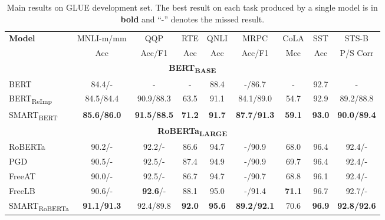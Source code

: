\documentclass[11pt]{article} \usepackage{url}
\newcommand\model{SMART}
\begin{document}
\begin{table*}[!htb]
\begin{center}
		\begin{tabular}{@{\hskip1pt}l@{\hskip1pt}|@{\hskip1pt}c@{\hskip1pt}|c@{\hskip1pt}|c@{\hskip1pt}|c@{\hskip1pt}|c@{\hskip1pt}|@{\hskip1pt}c @{\hskip1pt}|@{\hskip1pt} c @{\hskip1pt}|@{\hskip1pt}c@{\hskip1pt}}
			\hline \bf Model            &MNLI-{m/mm}        &QQP                &RTE            &QNLI           &MRPC               &CoLA           &SST          &STS-B\\ 
			                            &Acc                &Acc/F1             &Acc            &Acc            &Acc/F1             &Mcc            &Acc            &P/S Corr       \\ \hline
			\hline
            \multicolumn{9}{c}{\textbf{BERT\textsubscript{BASE}}}\\ \hline	
			BERT \cite{devlin2018bert}   &84.4/-             &-                  &-              &88.4           &-/86.7             &-              &92.7           &-\\ \hline
			BERT\textsubscript{ReImp}               &84.5/84.4          &90.9/88.3          &63.5           &91.1           &84.1/89.0          &54.7           &92.9           &89.2/88.8\\  \hline
{\model}\textsubscript{BERT}                     &\textbf{85.6/86.0} &\textbf{91.5/88.5} & \textbf{71.2} & \textbf{91.7} &\textbf{87.7/91.3} & \textbf{59.1} &\textbf{93.0}  &\textbf{90.0/89.4} \\ \hline \hline
\multicolumn{9}{c}{\textbf{RoBERTa\textsubscript{LARGE}}}\\	 \hline		
        RoBERTa \cite{liu2019roberta}    &90.2/-         &92.2/-                 &86.6           &94.7           &-/90.9             &68.0           &96.4           &92.4/-\\ \hline 
        PGD \cite{zhu2019freelb}         &90.5/-         &92.5/-                 &87.4           &94.9           &-/90.9             &69.7           &96.4           &92.4/- \\ \hline
        FreeAT \cite{zhu2019freelb}      &90.0/-         &92.5/-                 &86.7           &94.7           &-/90.7             &68.8           &96.1           &92.4/- \\ \hline
        FreeLB \cite{zhu2019freelb}      &90.6/-         &\textbf{92.6}/-        &88.1           &95.0           &-/91.4             &\textbf{71.1}  &96.7           &92.7/- \\ \hline \hline
        {\model}\textsubscript{RoBERTa} &\textbf{91.1/91.3}  &92.4/89.8         &\textbf{92.0}  &\textbf{95.6}  &\textbf{89.2/92.1} &70.6           &\textbf{96.9}  &\textbf{92.8/92.6} \\ \hline
		\end{tabular}
	\end{center}
\caption{Main results on GLUE development set. The best result on each task produced by a single model is in \textbf{bold} and ``-'' denotes the missed result.
	}
	\label{tab:glue_dev}
\end{table*}
\end{document}

